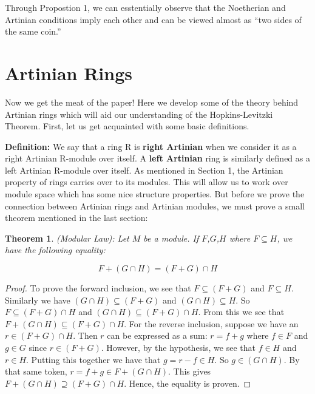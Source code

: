 \documentclass[11pt]{article}
\newtheorem{theorem}{Theorem}[section]
\begin{document}
Through Propostion 1, we can esstentially observe that the Noetherian and Artinian conditions imply each other and can be viewed almost as ``two sides of the same coin.'' 

\section{Artinian Rings}

Now we get the meat of the paper! Here we develop some of the theory behind Artinian rings which will aid our understanding of the Hopkins-Levitzki Theorem. First, let us get acquainted with some basic definitions. \newline

\noindent
\textbf{Definition:} We say that a ring R is \textbf{right Artinian} when we consider it as a right Artinian R-module over itself. A \textbf{left Artinian} ring is similarly defined as a left Artinian R-module over itself. As mentioned in Section 1, the Artinian property of rings carries over to its modules. This will allow us to work over module space which has some nice structure properties. But before we prove the connection between Artinian rings and Artinian modules, we must prove a small theorem mentioned in the last section:

\noindent
\begin{theorem} \label{modlaw} (Modular Law): Let $M$ be a module. If $F$,$G$,$H$ where $F \subseteq H$, we have the following equality: \end{theorem}
 
\begin{equation}
F + (G \cap H) = (F+G) \cap H 
\end{equation}

\noindent
\begin{proof} To prove the forward inclusion, we see that $F \subseteq (F+G)$ and $F \subseteq H$. Similarly we have $(G \cap H) \subseteq (F+G)$ and $(G \cap H) \subseteq H$.
So $F \subseteq (F+G) \cap H$ and $(G \cap H) \subseteq (F+G) \cap H $. From this we see that $F + (G \cap H) \subseteq (F+G) \cap H$. For the reverse inclusion, suppose we have an $r \in (F+G) \cap H$.
Then $r$ can be expressed as a sum: $r = f + g$ where $f \in F$ and $g \in G$ since $r \in (F+G)$. However, by the hypothesis, we see that $f \in H$ and $r \in H$. Putting this together we have that $g = r - f \in H$. So $g \in (G \cap H)$. By that same token,
$r = f + g \in F + (G \cap H)$. This gives $F + (G \cap H) \supseteq (F+G) \cap H$. Hence, the equality is proven. 
\end{proof}
\end{document}
